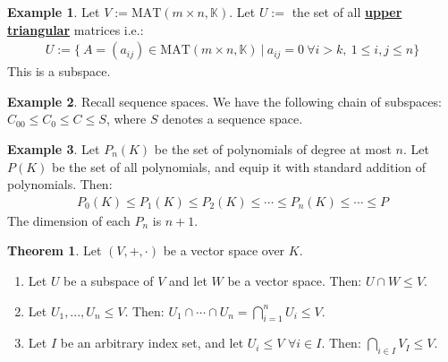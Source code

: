 \documentclass[11pt]{scrartcl}
\theoremstyle{definition}
\newtheorem{theorem}{Theorem}
\newtheorem{ex}{Example}
\theoremstyle{remark}
\newcommand{\dfn}[1]{\textbf{\underline{#1}}}
\newcommand{\mat}[1]{\text{MAT}(m \times n, \mathbb{#1})}
\begin{document}
\begin{ex}
Let $V:= \mat{K}$. Let $U:=$ the set of all \dfn{upper triangular} matrices i.e.: 
\begin{align*}
	U := \{\ A = (a_{ij}) \in \mat{K}\ |\ a_{ij} = 0\ \forall i > k,\ 1 \leq i,j \leq n \} 
\end{align*}	
This is a subspace. 
\end{ex}

\begin{ex} 
	Recall sequence spaces. We have the following chain of subspaces: $C_{00} \leq C_0 \leq C \leq S$, where $S$ denotes a sequence space.	
\end{ex}

\begin{ex} 
	Let $P_n(K)$ be the set of polynomials of degree at most $n$. Let $P(K)$ be the set of all polynomials, and equip it with standard addition of polynomials. Then: 
	\begin{align*}
			P_0(K) \leq P_1(K) \leq P_2(K) \leq \cdots \leq P_n(K) \leq \cdots \leq P 
	\end{align*}	
	The dimension of each $P_n$ is $n+1$. 
\end{ex}

\begin{theorem} 
Let $(V, +, \cdot)$ be a vector space over $K$. 
	\begin{enumerate}
		\item Let $U$ be a subspace of $V$ and let $W$ be a vector space. Then: $U \cap W \leq V$. 
		\item Let $U_1, ..., U_n \leq V$. Then: $U_1 \cap \cdots \cap U_n = \bigcap_{i=1}^n U_i \leq V$. 
		\item Let $I$ be an arbitrary index set, and let $U_i \leq V$ $\forall i \in I$. Then: $\bigcap_{i \in I} V_I \leq V$. 
	\end{enumerate}
\end{theorem}
\end{document}
